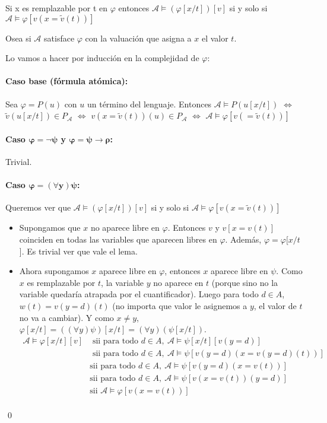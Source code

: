\begin{lema}\label{lema::sustitucion}
	Si x es remplazable por t en $\varphi$ entonces $\mathcal{A}\vDash(\varphi[x/t])[v]$ si y solo si $\mathcal{A}\vDash\varphi[v(x=\tilde{v}(t))]$
	
	Osea si $\mathcal{A}$ satisface $\varphi$ con la valuación que asigna a $x$ el valor $t$.
\end{lema}

\begin{demo}
	Lo vamos a hacer por inducción en la complejidad de $\varphi$:
	
	\paragraph{Caso base (fórmula atómica):} Sea $\varphi = P(u)$ con $u$ un término del lenguaje. Entonces $\mathcal{A}\vDash P(u[x/t])$ $\iff$ $\tilde{v}(u[x/t])\in P_\mathcal{A}$ $\iff$ $v(x=\tilde{v}(t))(u)\in P_\mathcal{A}$ $\iff$ $\mathcal{A}\vDash\varphi[v(=\tilde{v}(t))]$
	
	\paragraph{Caso $\bm{\varphi = \lnot\psi}$ y $\bm{\varphi=\psi\to\rho}$:} Trivial.
	
	\paragraph{Caso $\bm{\varphi = (\forall y) \psi}$:} Queremos ver que $\mathcal{A}\vDash(\varphi[x/t])[v]$ si y solo si $\mathcal{A}\vDash\varphi[v(x=\tilde{v}(t))]$
	\begin{itemize}
		\item Supongamos que $x$ no aparece libre en $\varphi$. Entonces $v$ y $v[x=v(t)]$ coinciden en todas las variables que aparecen libres en $\varphi$. Además, $\varphi=\varphi[x/t$]. Es trivial ver que vale el lema.
		\item Ahora supongamos $x$ aparece libre en $\varphi$, entonces $x$ aparece libre en $\psi$. Como $x$ es remplazable por $t$, la variable $y$ no aparece en $t$ (porque sino no la variable quedaría atrapada por el cuantificador). Luego para todo $d\in A$, $w(t) = v(y=d)(t)$ (no importa que valor le asignemos a $y$, el valor de $t$ no va a cambiar). Y como $x\neq y$, $\varphi[x/t] = ((\forall y)\psi)[x/t] = (\forall y)(\psi[x/t])$.
\begin{align*}
\mathcal{A}\vDash\varphi[x/t][v] &\text{ sii para todo }d\in A,~\mathcal{A}\vDash\psi[x/t][v(y = d)] \\ 
&\text{ sii para todo }d\in A,~ \mathcal{A}\vDash\psi[v(y=d)(x = v(y=d)(t))]  \\
& \text{sii para todo }d\in A,~ \mathcal{A}\vDash\psi[v(y=d)(x = v(t))] \\
& \text{sii para todo }d\in A,~ \mathcal{A}\vDash\psi[v(x = v(t))(y=d)] \\
& \text{sii }\mathcal{A}\vDash\varphi[v(x = v(t))] \\
\end{align*}
	\end{itemize}\qed
\end{demo}

